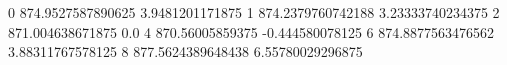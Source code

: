 0 874.9527587890625 3.9481201171875
1 874.2379760742188 3.23333740234375
2 871.004638671875 0.0
4 870.56005859375 -0.444580078125
6 874.8877563476562 3.88311767578125
8 877.5624389648438 6.55780029296875
